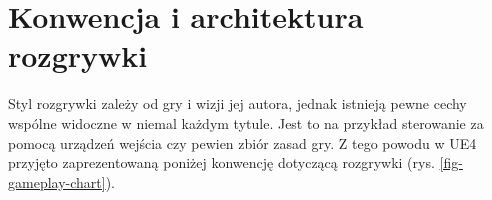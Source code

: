 \documentclass[multip]{SGGW-thesis}
\begin{document}
\section{Konwencja i architektura rozgrywki}
\label{sec:konwencja}
Styl rozgrywki zależy od gry i wizji jej autora, jednak istnieją pewne cechy wspólne widoczne w niemal każdym tytule. Jest to na przykład sterowanie za pomocą urządzeń wejścia czy pewien zbiór zasad gry. Z tego powodu w UE4 przyjęto zaprezentowaną poniżej konwencję dotyczącą rozgrywki (rys. \ref{fig-gameplay-chart}).\cite{docs-gameplay-framework}
\end{document}
